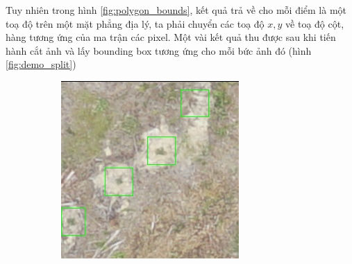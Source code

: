 \documentclass[a4paper, 12pt]{report}
\begin{document}
%
Tuy nhiên trong hình \ref{fig:polygon_bounds},  kết quả trả về cho mỗi điểm là một toạ độ trên một mặt phẳng địa lý,  ta phải chuyển các toạ độ $x,y$ về toạ độ cột,  hàng tương ứng của ma trận các pixel.  Một vài kết quả thu được sau khi tiến hành cắt ảnh và lấy bounding box tương ứng cho mỗi bức ảnh đó (hình \ref{fig:demo_split})
\newpage
\begin{figure}[!h]
    \centering
    \begin{subfigure}[!h]{0.45\textwidth}
    \includegraphics[width=\linewidth]{Images/original/Img_RSKA003603_0_r000_c256}
        \label{fig:subfig1}
    \end{subfigure}%
    \quad
    \begin{subfigure}[!h]{0.45\textwidth}

\end{subfigure}
\end{figure}
\end{document}
